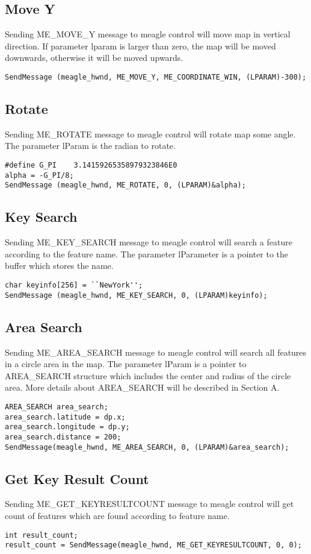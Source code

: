 \documentclass[a4paper]{article}
\begin{document}
\subsection{Move Y}
Sending ME\_MOVE\_Y message to meagle control will move map in vertical direction. If parameter lparam is larger than zero, the map will be moved downwards, otherwise it will be moved upwards.   
\begin{lstlisting}
SendMessage (meagle_hwnd, ME_MOVE_Y, ME_COORDINATE_WIN, (LPARAM)-300);
\end{lstlisting}

\subsection{Rotate}
Sending ME\_ROTATE message to meagle control will rotate map some angle.  The parameter lParam is the radian to rotate.
\begin{lstlisting}
#define G_PI    3.14159265358979323846E0
alpha = -G_PI/8;
SendMessage (meagle_hwnd, ME_ROTATE, 0, (LPARAM)&alpha);
\end{lstlisting}

\subsection{Key Search}
Sending ME\_KEY\_SEARCH message to meagle control will search a feature according to the feature name. The parameter lParameter is a pointer to the buffer which stores the name.
\begin{lstlisting}
char keyinfo[256] = ``NewYork'';
SendMessage (meagle_hwnd, ME_KEY_SEARCH, 0, (LPARAM)keyinfo);
\end{lstlisting}

\subsection{Area Search}
Sending ME\_AREA\_SEARCH message to meagle control will search all features in a circle area in the map. The parameter lParam is a pointer to AREA\_SEARCH structure which includes the center and radius of the circle area. More details about AREA\_SEARCH will be described in Section A.
\begin{lstlisting}
AREA_SEARCH area_search;
area_search.latitude = dp.x;
area_search.longitude = dp.y;
area_search.distance = 200;
SendMessage(meagle_hwnd, ME_AREA_SEARCH, 0, (LPARAM)&area_search);
\end{lstlisting}

\subsection{Get Key Result Count}
Sending ME\_GET\_KEYRESULTCOUNT message to meagle control will get count of features which are found according to feature name.
\begin{lstlisting}
int result_count;
result_count = SendMessage(meagle_hwnd, ME_GET_KEYRESULTCOUNT, 0, 0);
\end{lstlisting}
\end{document}
